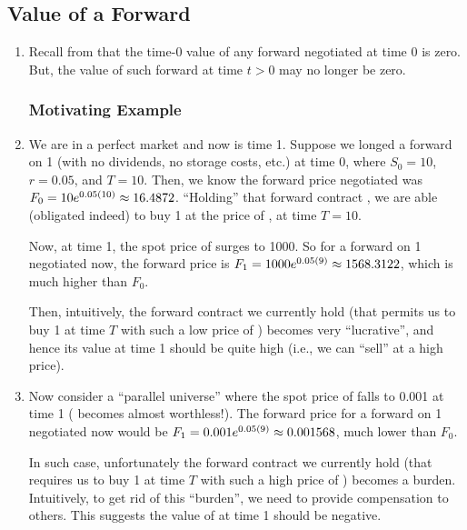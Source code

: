 \subsection{Value of a Forward}
\label{subsect:value-fwd}
\begin{enumerate}
\item Recall from  that the time-0 value of any
forward negotiated at time 0 is zero. But, the value of such forward at time
\(t>0\) may no longer be zero.

\subsubsection*{Motivating Example}
\item We are in a perfect market and now is time 1.
Suppose we longed a forward on 1  (with no dividends, no
storage costs, etc.) at time 0, where \(S_0=10\), \(r=0.05\), and \(T=10\).
Then, we know the forward price negotiated was \(F_0=10e^{0.05(10)}\approx
\fpeval{round(10*exp(0.05*10),4)}\).  ``Holding'' that forward contract
, we are able (obligated indeed) to buy 1  at the
price of , at time \(T=10\).

Now, at time 1, the spot price of  surges 
to 1000. So for a forward on 1  negotiated now, the forward
price is \(F_1=1000e^{0.05(9)}\approx \fpeval{round(1000*exp(0.05*9),4)}\),
which is much higher than \(F_0\).

Then, intuitively, the forward contract
 we currently hold (that permits us to buy 1 
at time \(T\) with such a low price of )
becomes very ``lucrative'', and hence its value at time 1 should be quite high
(i.e., we can ``sell''  at a high price).

\item Now consider a ``parallel universe'' where the spot price of
 falls  to 0.001 at time 1
( becomes almost worthless!). The forward price for a forward
on 1  negotiated now would be \(F_1=0.001e^{0.05(9)}\approx
\fpeval{round(0.001*exp(0.05*9),6)}\), much lower than \(F_0\).

In such case, unfortunately the forward contract  we currently
hold (that requires us to buy 1  at time \(T\) with such a
high price of ) becomes a burden.
Intuitively, to get rid of this ``burden'', we need to provide compensation to
others.  This suggests the value of  at time 1 should be
negative.


\end{enumerate}
